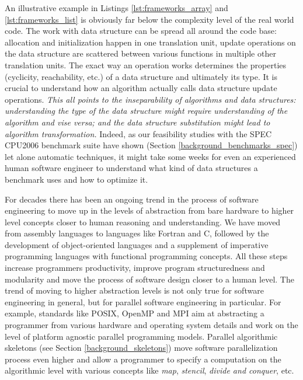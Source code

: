 \begin{description}[style=unboxed,leftmargin=0cm]
\item[\textit{Data structure and algorithm inseparability}] An illustrative example in Listings \ref{lst:frameworks_array} and \ref{lst:frameworks_list} is obviously far below the complexity level of the real world code. The work with data structure can be spread all around the code base: allocation and initialization happen in one translation unit, update operations on the data structure are scattered between various functions in multiple other translation units. The exact way an operation works determines the properties (cyclicity, reachability, etc.) of a data structure and ultimately its type. It is crucial to understand how an algorithm actually calls data structure update operations. \textit{This all points to the inseparability of algorithms and data structures: understanding the type of the data structure might require understanding of the algorithm and vise versa; and the data structure substitution might lead to algorithm transformation.} Indeed, as our feasibility studies with the SPEC CPU2006 benchmark suite have shown (Section \ref{background_benchmarks_spec}) let alone automatic techniques, it might take some weeks for even an experienced human software engineer to understand what kind of data structures a benchmark uses and how to optimize it.
\item[\textit{The ongoing trend to higher abstraction levels}] For decades there has been an ongoing trend in the process of software engineering to move up in the levels of abstraction from bare hardware to higher level concepts closer to human reasoning and understanding. We have moved from assembly languages to languages like Fortran and C, followed by the development of object-oriented languages and a supplement of imperative programming languages with functional programming concepts. All these steps increase programmers productivity, improve program structuredness and modularity and move the process of software design closer to a human level. The trend of moving to higher abstraction levels is not only true for software engineering in general, but for parallel software engineering in particular. For example, standards like POSIX, OpenMP and MPI aim at abstracting a programmer from various hardware and operating system details and work on the level of platform agnostic parallel programming models. Parallel algorithmic skeletons \cite{mccool-patterns} (see Section \ref{background_skeletons}) move software parallelization process even higher and allow a programmer to specify a computation on the algorithmic level with various concepts like \textit{map}, \textit{stencil}, \textit{divide and conquer}, etc.
\end{description}
